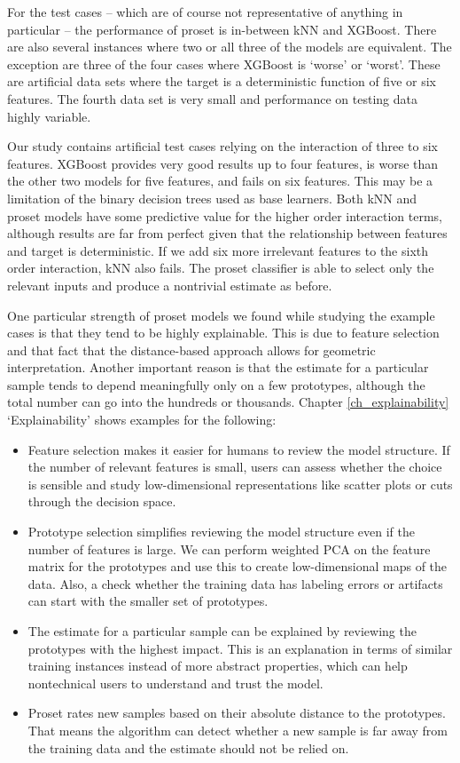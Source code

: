 %
For the test cases -- which are of course not representative of anything in particular -- the performance of proset is in-between kNN and XGBoost.
There are also several instances where two or all three of the models are equivalent.
The exception are three of the four cases where XGBoost is `worse' or `worst'.
These are artificial data sets where the target is a deterministic function of five or six features.
The fourth data set is very small and performance on testing data highly variable.\par
%
Our study contains artificial test cases relying on the interaction of three to six features.
XGBoost provides very good results up to four features, is worse than the other two models for five features, and fails on six features.
This may be a limitation of the binary decision trees used as base learners.
Both kNN and proset models have some predictive value for the higher order interaction terms, although results are far from perfect given that the relationship between features and target is deterministic.
If we add six more irrelevant features to the sixth order interaction, kNN also fails.
The proset classifier is able to select only the relevant inputs and produce a nontrivial estimate as before.\par
%
One particular strength of proset models we found while studying the example cases is that they tend to be highly explainable.
This is due to feature selection and that fact that the distance-based approach allows for geometric interpretation.
Another important reason is that the estimate for a particular sample tends to depend meaningfully only on a few prototypes, although the total number can go into the hundreds or thousands.
Chapter \ref{ch_explainability} `Explainability' shows examples for the following:
%
\begin{itemize}
\item Feature selection makes it easier for humans to review the model structure.
If the number of relevant features is small, users can assess whether the choice is sensible and study low-dimensional representations like scatter plots or cuts through the decision space.
%
\item Prototype selection simplifies reviewing the model structure even if the number of features is large.
We can perform weighted PCA on the feature matrix for the prototypes and use this to create low-dimensional maps of the data.
Also, a check whether the training data has labeling errors or artifacts can start with the smaller set of prototypes.
%
\item The estimate for a particular sample can be explained by reviewing the prototypes with the highest impact.
This is an explanation in terms of similar training instances instead of more abstract properties, which can help nontechnical users to understand and trust the model.
%
\item Proset rates new samples based on their absolute distance to the prototypes.
That means the algorithm can detect whether a new sample is far away from the training data and the estimate should not be relied on.
\end{itemize}
